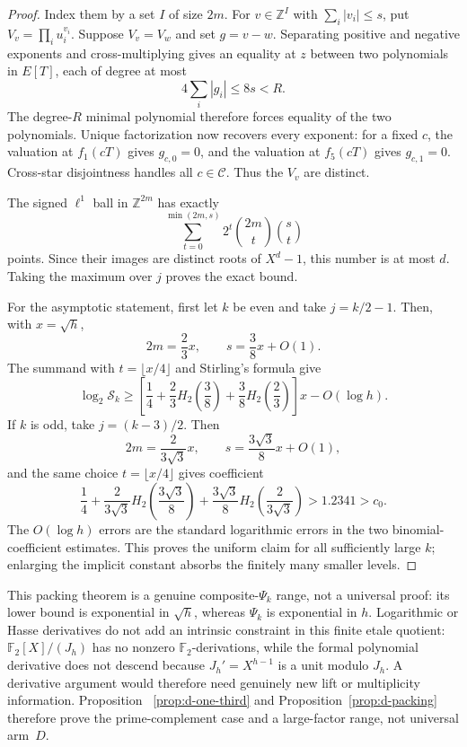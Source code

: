 \documentclass[11pt]{article}
\theoremstyle{definition}
\theoremstyle{remark}
\begin{document}
\begin{proof}
Index them by a set $I$ of size $2m$.  For
$v\in\mathbb Z^I$ with $\sum_i|v_i|\leq s$, put
$V_v=\prod_i u_i^{v_i}$.  Suppose $V_v=V_w$ and set $g=v-w$.  Separating
positive and negative exponents and cross-multiplying gives an equality at
$z$ between two polynomials in $E[T]$, each of degree at most
\[
 4\sum_i|g_i|\leq8s<R.
\]
The degree-$R$ minimal polynomial therefore forces equality of the two
polynomials.  Unique factorization now recovers every exponent: for a fixed
$c$, the valuation at $f_1(cT)$ gives $g_{c,0}=0$, and the valuation at
$f_5(cT)$ gives $g_{c,1}=0$.  Cross-star disjointness handles all
$c\in\mathcal C$.  Thus the $V_v$ are distinct.

The signed $\ell^1$ ball in $\mathbb Z^{2m}$ has exactly
\[
 \sum_{t=0}^{\min(2m,s)}
 2^t\binom{2m}{t}\binom{s}{t}
\]
points.  Since their images are distinct roots of $X^d-1$, this number is
at most $d$.  Taking the maximum over $j$ proves the exact bound.

For the asymptotic statement, first let $k$ be even and take
$j=k/2-1$.  Then, with $x=\sqrt h$,
\[
 2m=\frac23x,\qquad s=\frac38x+O(1).
\]
The summand with $t=\lfloor x/4\rfloor$ and Stirling's formula give
\[
 \log_2\mathcal S_k\geq
 \left[\frac14+\frac23H_2\!\left(\frac38\right)
                  +\frac38H_2\!\left(\frac23\right)\right]x
 -O(\log h).
\]
If $k$ is odd, take $j=(k-3)/2$.  Then
\[
 2m=\frac{2}{3\sqrt3}x,
 \qquad s=\frac{3\sqrt3}{8}x+O(1),
\]
and the same choice $t=\lfloor x/4\rfloor$ gives coefficient
\[
 \frac14+\frac{2}{3\sqrt3}H_2\!\left(\frac{3\sqrt3}{8}\right)
 +\frac{3\sqrt3}{8}H_2\!\left(\frac{2}{3\sqrt3}\right)
 >1.2341>c_0.
\]
The $O(\log h)$ errors are the standard logarithmic errors in the two
binomial-coefficient estimates.  This proves the uniform claim for all
sufficiently large $k$; enlarging the implicit constant absorbs the finitely
many smaller levels.
\end{proof}

This packing theorem is a genuine composite-$\Psi_k$ range, not a universal
proof: its lower bound is exponential in $\sqrt h$, whereas $\Psi_k$ is
exponential in $h$.  Logarithmic or Hasse
derivatives do not add an intrinsic constraint in this finite etale quotient:
$\mathbb F_2[X]/(J_h)$ has no nonzero $\mathbb F_2$-derivations, while the
formal polynomial derivative does not descend because
$J_h'=X^{h-1}$ is a unit modulo $J_h$.  A derivative argument would therefore
need genuinely new lift or multiplicity information.  Proposition~
\ref{prop:d-one-third} and Proposition~\ref{prop:d-packing} therefore prove
the prime-complement case and a large-factor range, not universal arm~$D$.
\end{document}
